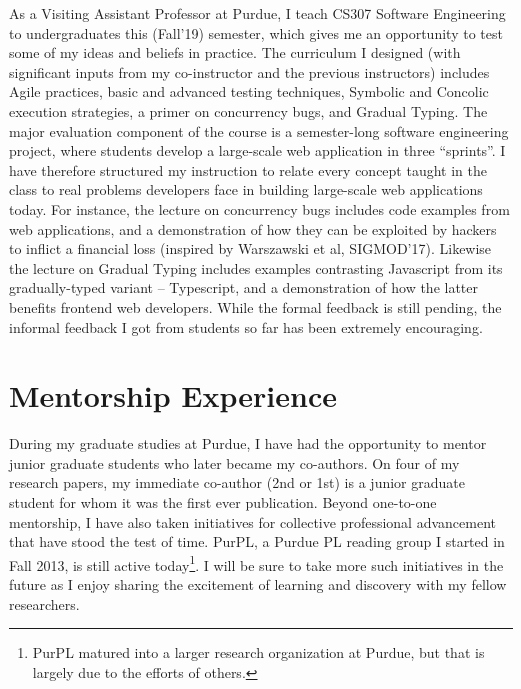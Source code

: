As a Visiting Assistant Professor at Purdue, I teach CS307 Software
Engineering to undergraduates this (Fall'19) semester, which gives me
an opportunity to test some of my ideas and beliefs in practice. The
curriculum I designed (with significant inputs from my co-instructor
and the previous instructors) includes Agile practices, basic and
advanced testing techniques, Symbolic and Concolic execution
strategies, a primer on concurrency bugs, and Gradual Typing. The
major evaluation component of the course is a semester-long software
engineering project, where students develop a large-scale web
application in three ``sprints''. I have therefore structured my
instruction to relate every concept taught in the class to real
problems developers face in building large-scale web applications
today. For instance, the lecture on concurrency bugs includes code
examples from web applications, and a demonstration of how they can be
exploited by hackers to inflict a financial loss (inspired by
Warszawski et al, SIGMOD'17). Likewise the lecture on Gradual Typing
includes examples contrasting Javascript from its gradually-typed
variant -- Typescript, and a demonstration of how the latter benefits
frontend web developers. While the formal feedback is still pending,
the informal feedback I got from students so far has been extremely
encouraging.

\section*{Mentorship Experience}

During my graduate studies at Purdue, I have had the opportunity to
mentor junior graduate students who later became my co-authors. On
four of my research papers, my immediate co-author (2nd or 1st) is a
junior graduate student for whom it was the first ever publication.
Beyond one-to-one mentorship, I have also taken initiatives for
collective professional advancement that have stood the test of time.
PurPL, a Purdue PL reading group I started in Fall 2013, is still
active today\footnote{PurPL matured into a larger research
organization at Purdue, but that is largely due to the efforts of
others.}. I will be sure to take more such initiatives in the future
as I enjoy sharing the excitement of learning and discovery with my
fellow researchers.
